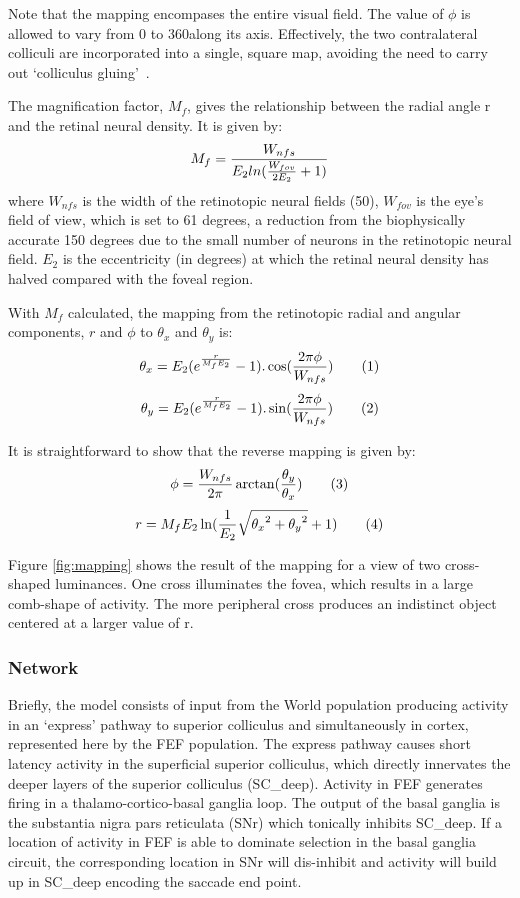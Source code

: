 \documentclass{frontiersSCNS}
\begin{document}
Note that the mapping encompases the entire visual field. The value of
$\phi$ is allowed to vary from 0 to 360\degrees along its axis.
Effectively, the two contralateral colliculi are incorporated into a
single, square map, avoiding the need to carry out `colliculus
gluing'~\cite{tabareau_geometry_2007}.

The magnification factor, $M_f$, gives the relationship between the
radial angle r and the retinal neural density. It is given by:
\[
   M_f = {W_{nfs} \over E_2 ln ({W_{fov} \over 2 E_2} + 1)}
\]
where $W_{nfs}$ is the width of the retinotopic neural fields (50),
$W_{fov}$ is the eye's field of view, which is set to 61 degrees, a
reduction from the biophysically accurate 150 degrees due to the small
number of neurons in the retinotopic neural field. $E_2$ is the
eccentricity (in degrees) at which the retinal neural density has
halved compared with the foveal region.

With $M_f$ calculated, the mapping from the retinotopic radial and
angular components, $r$ and $\phi$ to $\theta_x$ and $\theta_y$ is:
\[
   \theta_x = E_2 (e^{{r \over M_f E_2}} - 1).\cos({2 \pi \phi \over
   W_{nfs}}) \tag{1}
\]
\[
   \theta_y = E_2 (e^{{r \over M_f E_2}} - 1).\sin({2 \pi \phi \over W_{nfs}}) \tag{2}
\]

It is straightforward to show that the reverse mapping is given by:
\[
   \phi = {W_{nfs} \over 2 \pi}\arctan({\theta_y\over\theta_x}) \tag{3}
\]
\[
   r = M_f E_2 \ln ({1\over E_2}\sqrt{{\theta_x}^2 + {\theta_y}^2}+1) \tag{4}
\]

Figure \ref{fig:mapping} shows the result of the mapping for a view of two
cross-shaped luminances. One cross illuminates the fovea, which
results in a large comb-shape of activity. The more peripheral cross
produces an indistinct object centered at a larger value of r.

\subsubsection{Network}

Briefly, the model consists of input from the World population
producing activity in an `express' pathway to superior colliculus
and simultaneously in cortex, represented here by the FEF
population. The express pathway causes short latency activity in the
superficial superior colliculus, which directly innervates the deeper
layers of the superior colliculus (SC\_deep). Activity in FEF
generates firing in a thalamo-cortico-basal ganglia loop. The output
of the basal ganglia is the substantia nigra pars reticulata (SNr)
which tonically inhibits SC\_deep. If a location of activity in FEF is
able to dominate selection in the basal ganglia circuit, the
corresponding location in SNr will dis-inhibit and activity will build
up in SC\_deep encoding the saccade end point.
\end{document}
